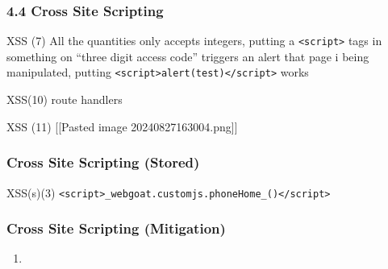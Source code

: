 \documentclass[
	letterpaper, %
	10pt, %
	unnumberedsections, %
	twoside, %
]{APAAssignment}
\begin{document}
\begin{appendices}
{\subsubsection{4.4 Cross Site Scripting}\label{cross-site-scripting}}

XSS (7) All the quantities only accepts integers, putting a
\texttt{\textless{}script\textgreater{}} tags in something on ``three
digit access code'' triggers an alert that page i being manipulated,
putting
\texttt{\textless{}script\textgreater{}alert(test)\textless{}/script\textgreater{}}
works

XSS(10) route handlers

XSS (11) {[}{[}Pasted image 20240827163004.png{]}{]}

\hypertarget{cross-site-scripting-stored}{%
\subsubsection{Cross Site Scripting
(Stored)}\label{cross-site-scripting-stored}}

XSS(s)(3)
\texttt{\textless{}script\textgreater{}\_webgoat.customjs.phoneHome\_()\textless{}/script\textgreater{}}

\hypertarget{cross-site-scripting-mitigation}{%
\subsubsection{Cross Site Scripting
(Mitigation)}\label{cross-site-scripting-mitigation}}

\begin{enumerate}
\def\labelenumi{(\arabic{enumi})}
\setcounter{enumi}{4}
\tightlist
\item
\end{enumerate}


\end{appendices}
\end{document}
